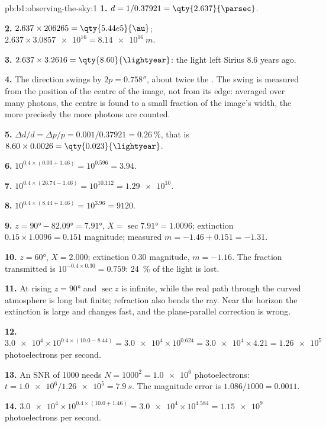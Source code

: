 \begin{solution}{pb:b1:observing-the-sky:1}
\textbf{1.} $d = 1/0.37921 = \qty{2.637}{\parsec}$.

\textbf{2.} $2.637\times206265 = \qty{5.44e5}{\au}$;
$2.637\times\num{3.0857e16} = \qty{8.14e16}{m}$.

\textbf{3.} $2.637\times3.2616 = \qty{8.60}{\lightyear}$: the light left
Sirius 8.6 years ago.

\textbf{4.} The direction swings by $2p = \ang{;;0.758}$, about twice the
. The swing is measured from the position of the centre of the image,
not from its edge: averaged over many photons, the centre is found to a
small fraction of the image's width, the more precisely the more photons
are counted.

\textbf{5.} $\Delta d/d = \Delta p/p = 0.001/0.37921 = \qty{0.26}{\percent}$,
that is $8.60\times0.0026 = \qty{0.023}{\lightyear}$.

\textbf{6.} $10^{0.4\times(0.03 + 1.46)} = 10^{0.596} = 3.94$.

\textbf{7.} $10^{0.4\times(26.74 - 1.46)} = 10^{10.112} = \num{1.29e10}$.

\textbf{8.} $10^{0.4\times(8.44 + 1.46)} = 10^{3.96} = \num{9120}$.

\textbf{9.} $z = \ang{90} - \ang{82.09} = \ang{7.91}$, $X = \sec\ang{7.91} =
1.0096$; extinction $0.15\times1.0096 = 0.151$ magnitude; measured
$m = -1.46 + 0.151 = -1.31$.

\textbf{10.} $z = \ang{60}$, $X = 2.000$; extinction 0.30 magnitude,
$m = -1.16$. The fraction transmitted is $10^{-0.4\times0.30} = 0.759$:
\qty{24}{\percent} of the light is lost.

\textbf{11.} At rising $z = \ang{90}$ and $\sec z$ is infinite, while the
real path through the curved atmosphere is long but finite; refraction also
bends the ray. Near the horizon the extinction is large and changes fast,
and the plane-parallel correction is wrong.

\textbf{12.} $\num{3.0e4}\times10^{0.4\times(10.0 - 8.44)} = \num{3.0e4}
\times10^{0.624} = \num{3.0e4}\times4.21 = \num{1.26e5}$ photoelectrons per
second.

\textbf{13.} An SNR of 1000 needs $N = 1000^2 = \num{1.0e6}$
photoelectrons: $t = \num{1.0e6}/\num{1.26e5} = \qty{7.9}{s}$. The magnitude
error is $1.086/1000 = \num{0.0011}$.

\textbf{14.} $\num{3.0e4}\times10^{0.4\times(10.0 + 1.46)} = \num{3.0e4}
\times10^{4.584} = \num{1.15e9}$ photoelectrons per second.


\end{solution}
